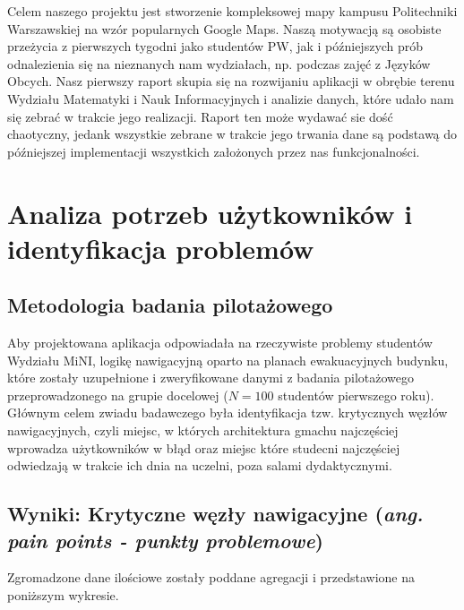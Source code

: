 \documentclass[14pt,a4paper]{extarticle}
\begin{document}
Celem naszego projektu jest stworzenie kompleksowej mapy kampusu Politechniki Warszawskiej na wzór popularnych Google Maps. Naszą motywacją są osobiste przeżycia z pierwszych tygodni jako studentów PW, jak i późniejszych prób odnalezienia się na nieznanych nam wydziałach, np. podczas zajęć z Języków Obcych. Nasz pierwszy raport skupia się na rozwijaniu aplikacji w obrębie terenu Wydziału Matematyki i Nauk Informacyjnych i analizie danych, które udało nam się zebrać w trakcie jego realizacji. Raport ten może wydawać sie dość chaotyczny, jedank wszystkie zebrane w trakcie jego trwania dane są podstawą do późniejszej implementacji wszystkich założonych przez nas funkcjonalności.

\section{Analiza potrzeb użytkowników i identyfikacja problemów}

\subsection{Metodologia badania pilotażowego}

Aby projektowana aplikacja odpowiadała na rzeczywiste problemy studentów Wydziału MiNI, logikę nawigacyjną oparto na planach ewakuacyjnych budynku, które zostały uzupełnione i zweryfikowane danymi z badania pilotażowego przeprowadzonego na grupie docelowej ($N = 100$ studentów pierwszego roku). Głównym celem zwiadu badawczego była identyfikacja tzw. krytycznych węzłów nawigacyjnych, czyli miejsc, w których architektura gmachu najczęściej wprowadza użytkowników w błąd oraz miejsc które studecni najczęściej odwiedzają w trakcie ich dnia na uczelni, poza salami dydaktycznymi.

\subsection{Wyniki: Krytyczne węzły nawigacyjne (\textit{ang. pain points - punkty problemowe})}

Zgromadzone dane ilościowe zostały poddane agregacji i przedstawione na poniższym wykresie.
\end{document}
